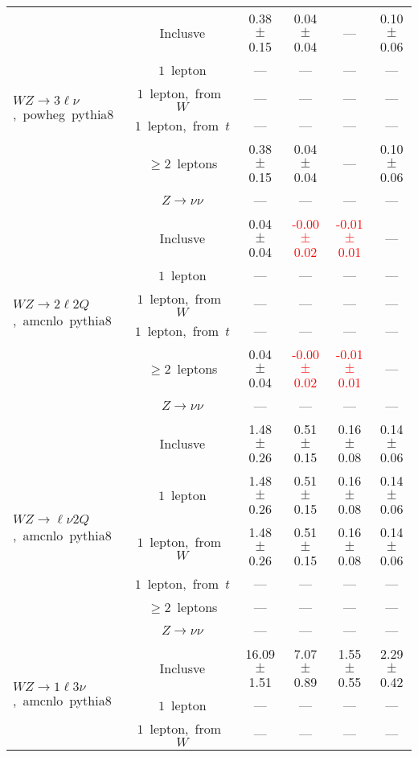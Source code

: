 \documentclass{article}
\begin{document}
\begin{longtable}{|l|c|c|c|c|c|}
\hline 
\multirow{6}{*}{$WZ{\rightarrow}3\ell\nu$,~powheg~pythia8} & Inclusve  & 0.38 $\pm$ 0.15  & 0.04 $\pm$ 0.04  & ---  & 0.10 $\pm$ 0.06 \\* 
 & $1$~lepton  & ---  & ---  & ---  & --- \\* 
 & $1$~lepton,~from~$W$  & ---  & ---  & ---  & --- \\* 
 & $1$~lepton,~from~$t$  & ---  & ---  & ---  & --- \\* 
 & $\ge2$~leptons  & 0.38 $\pm$ 0.15  & 0.04 $\pm$ 0.04  & ---  & 0.10 $\pm$ 0.06 \\* 
 & $Z\rightarrow\nu\nu$  & ---  & ---  & ---  & --- \\* 
\hline 
\multirow{6}{*}{$WZ{\rightarrow}2{\ell}2Q$,~amcnlo~pythia8} & Inclusve  & 0.04 $\pm$ 0.04  & \textcolor{red}{ -0.00 $\pm$ 0.02 }  & \textcolor{red}{ -0.01 $\pm$ 0.01 }  & --- \\* 
 & $1$~lepton  & ---  & ---  & ---  & --- \\* 
 & $1$~lepton,~from~$W$  & ---  & ---  & ---  & --- \\* 
 & $1$~lepton,~from~$t$  & ---  & ---  & ---  & --- \\* 
 & $\ge2$~leptons  & 0.04 $\pm$ 0.04  & \textcolor{red}{ -0.00 $\pm$ 0.02 }  & \textcolor{red}{ -0.01 $\pm$ 0.01 }  & --- \\* 
 & $Z\rightarrow\nu\nu$  & ---  & ---  & ---  & --- \\* 
\hline 
\multirow{6}{*}{$WZ{\rightarrow}{\ell}{\nu}2Q$,~amcnlo~pythia8} & Inclusve  & 1.48 $\pm$ 0.26  & 0.51 $\pm$ 0.15  & 0.16 $\pm$ 0.08  & 0.14 $\pm$ 0.06 \\* 
 & $1$~lepton  & 1.48 $\pm$ 0.26  & 0.51 $\pm$ 0.15  & 0.16 $\pm$ 0.08  & 0.14 $\pm$ 0.06 \\* 
 & $1$~lepton,~from~$W$  & 1.48 $\pm$ 0.26  & 0.51 $\pm$ 0.15  & 0.16 $\pm$ 0.08  & 0.14 $\pm$ 0.06 \\* 
 & $1$~lepton,~from~$t$  & ---  & ---  & ---  & --- \\* 
 & $\ge2$~leptons  & ---  & ---  & ---  & --- \\* 
 & $Z\rightarrow\nu\nu$  & ---  & ---  & ---  & --- \\* 
\hline 
\multirow{6}{*}{$WZ{\rightarrow}1{\ell}3{\nu}$,~amcnlo~pythia8} & Inclusve  & 16.09 $\pm$ 1.51  & 7.07 $\pm$ 0.89  & 1.55 $\pm$ 0.55  & 2.29 $\pm$ 0.42 \\* 
 & $1$~lepton  & ---  & ---  & ---  & --- \\* 
 & $1$~lepton,~from~$W$  & ---  & ---  & ---  & --- \\* 

\end{longtable}
\end{document}
